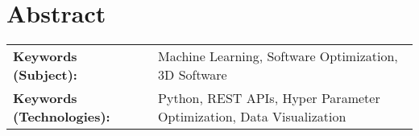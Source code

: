 
\section*{Abstract}


\begin{table}[ht]
\begin{tabular}{ll}
\textbf{Keywords (Subject):}      & Machine Learning, Software Optimization, 3D Software \\
\textbf{Keywords (Technologies):} & Python, REST APIs, Hyper Parameter Optimization, Data Visualization
\end{tabular}
\end{table}